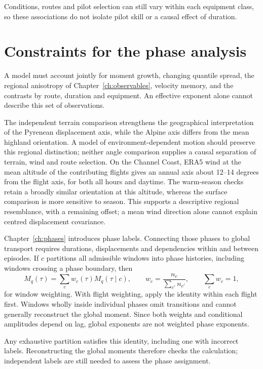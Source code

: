 Conditions, routes and pilot selection can still vary within each equipment class,
so these associations do not isolate pilot skill or a causal effect of duration.

\FloatBarrier
\section{Constraints for the phase analysis}
\label{sec:transport-verdict}

A model must account jointly for moment growth, changing quantile spread, the
regional anisotropy of Chapter~\ref{ch:observables}, velocity memory, and the contrasts
by route, duration and equipment. An effective exponent alone cannot describe this set of observations.

The independent terrain comparison strengthens the geographical interpretation
of the Pyrenean displacement axis, while the Alpine axis differs from the mean
highland orientation. A model of environment-dependent motion should preserve
this regional distinction; neither angle comparison supplies a causal separation
of terrain, wind and route selection. On the Channel Coast, ERA5 wind at the
mean altitude of the contributing flights gives an annual axis about 12--14
degrees from the flight axis, for both all hours and daytime. The warm-season
checks retain a broadly similar orientation at this altitude, whereas the
surface comparison is more sensitive to season. This supports a descriptive
regional resemblance, with a remaining offset; a mean wind direction alone
cannot explain centred displacement covariance.

Chapter~\ref{ch:phases} introduces phase labels. Connecting those phases to global
transport requires durations, displacements and dependencies within and between
episodes. If $c$ partitions all admissible windows into phase histories, including
windows crossing a phase boundary, then
\begin{equation}
  M_q(\tau)=\sum_c w_c(\tau)M_q(\tau\mid c),\qquad
  w_c=\frac{n_c}{\sum_{c'}n_{c'}},\qquad \sum_cw_c=1,
  \label{eq:phase-reconstruction}
\end{equation}
for window weighting. With flight weighting, apply the identity within each
flight first. Windows wholly inside individual phases omit transitions and
cannot generally reconstruct the global moment. Since both weights and conditional
amplitudes depend on lag, global exponents are not weighted phase exponents.

Any exhaustive partition satisfies this identity, including one with incorrect labels.
Reconstructing the global moments therefore checks the calculation; independent labels
are still needed to assess the phase assignment.
